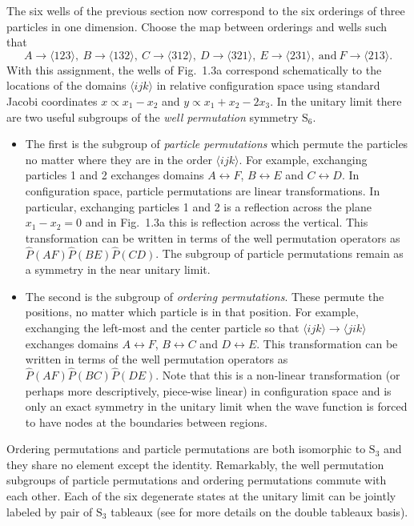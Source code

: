 The six wells of the previous section now correspond to the six orderings of three particles in one dimension. Choose the map between orderings and wells such that
\begin{equation}
A\rightarrow \langle 123 \rangle,\ B\rightarrow \langle 132 \rangle,\ C\rightarrow \langle 312 \rangle,\ D\rightarrow \langle 321 \rangle,\ E\rightarrow \langle 231 \rangle,\ \mbox{and}\ F\rightarrow \langle 213 \rangle.
\end{equation}
With this assignment, the wells of Fig.\ 1.3a correspond schematically to the locations of the domains $\langle ijk \rangle$ in relative configuration space using standard Jacobi coordinates $x \propto x_1 - x_2$ and $y \propto x_1 + x_2 - 2 x_3$. In the unitary limit there are two useful subgroups of the \emph{well permutation} symmetry  $\mathrm{S}_6$.
\begin{itemize}
\item The first is the subgroup of \emph{particle permutations} which permute the particles no matter where they are in the order $\langle ijk \rangle$. For example, exchanging particles 1 and 2 exchanges domains $A \leftrightarrow F$, $B \leftrightarrow E$ and $C \leftrightarrow D$. In configuration space, particle permutations are linear transformations. In particular, exchanging particles 1 and 2 is a reflection across the plane $x_1 - x_2 =0$ and in Fig.~1.3a this is reflection across the vertical. This transformation can be written in terms of the well permutation operators as $\hat{P}(AF)\hat{P}(BE)\hat{P}(CD)$. The subgroup of particle permutations remain as a symmetry in the near unitary limit.
\item The second is the subgroup of \emph{ordering permutations}. These permute the positions, no matter which particle is in that position. For example, exchanging the left-most and the center particle so that $\langle ijk \rangle \to \langle jik \rangle$ exchanges domains $A \leftrightarrow F$, $B \leftrightarrow C$ and $D \leftrightarrow E$. This transformation can be written in terms of the well permutation operators as $\hat{P}(AF)\hat{P}(BC)\hat{P}(DE)$. Note that this is a non-linear transformation (or perhaps more descriptively, piece-wise linear) in configuration space and is only an exact symmetry in the unitary limit when the wave function is forced to have nodes at the boundaries between regions.
\end{itemize}
Ordering permutations and particle permutations are both isomorphic to $\mathrm{S}_3$ and they share no element except the identity. Remarkably, the well permutation subgroups of particle permutations and ordering permutations commute with each other. Each of the six degenerate states at the unitary limit can be jointly labeled by pair of $\mathrm{S}_3$ tableaux (see \cite{Harshman2016b,harshman2016a} for more details on the double tableaux basis).

